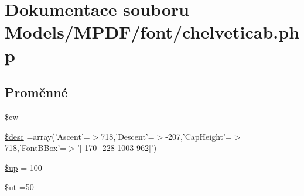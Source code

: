 \hypertarget{chelveticab_8php}{\section{Dokumentace souboru Models/\-M\-P\-D\-F/font/chelveticab.php}
\label{chelveticab_8php}
}
\subsection*{Proměnné}
\begin{DoxyCompactItemize}
\item 
\hyperlink{chelveticab_8php_ac2951b03dbb0317e6c61ec920b7479dc}{\$cw}
\item 
\hyperlink{chelveticab_8php_a31059b9e4d0c5af34df20da32232ea9a}{\$desc} =array('Ascent'=$>$718,'Descent'=$>$-\/207,'Cap\-Height'=$>$718,'Font\-B\-Box'=$>$'\mbox{[}-\/170 -\/228 1003 962\mbox{]}')
\item 
\hyperlink{chelveticab_8php_a6b5ad2ac55f9df46e8f34e78fbd6f176}{\$up} =-\/100
\item 
\hyperlink{chelveticab_8php_aadd3f841051043ee58e587e840e8dd0b}{\$ut} =50
\item 

\end{DoxyCompactItemize}
